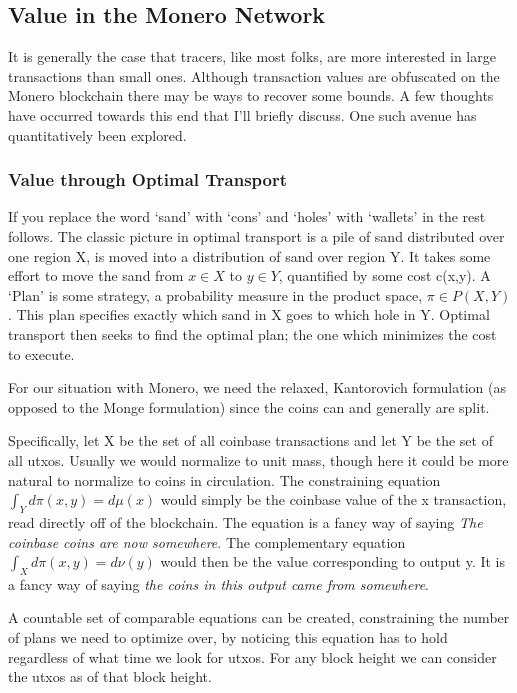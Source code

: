 \subsection{Value in the Monero Network}

It is generally the case that tracers, like most folks, are more interested in large transactions than small ones.  
Although transaction values are obfuscated on the Monero blockchain there may be ways to recover some bounds.
A few thoughts have occurred towards this end that I'll briefly discuss.  One such avenue has quantitatively been explored.

\subsubsection{Value through Optimal Transport}
If you replace the word `sand' with `cons' and `holes' with `wallets' in \cite{villani2009optimal} the rest follows.  
The classic picture in optimal transport is a pile of sand distributed over one region X, is moved into a distribution of sand over region Y.  
It takes some effort to move the sand from $x \in X$ to $y \in Y$, quantified by some cost c(x,y).  
A `Plan' is some strategy, a probability measure in the product space, $\pi \in P(X,Y)$.  This plan specifies exactly which sand in X goes to which hole in Y.
Optimal transport then seeks to find the optimal plan; the one which minimizes the cost to execute.

For our situation with Monero, we need the relaxed, Kantorovich formulation (as opposed to the Monge formulation) since the coins can and generally are split.

Specifically, let X be the set of all coinbase transactions and let Y be the set of all utxos.  
Usually we would normalize to unit mass, though here it could be more natural to normalize to coins in circulation.
The constraining equation $\int_Y d\pi(x,y) = d\mu(x)$ would simply be the coinbase value of the x transaction, read directly off of the blockchain.
The equation is a fancy way of saying \textit{The coinbase coins are now somewhere}.
The complementary equation  $\int_X d\pi(x,y) = d\nu(y)$ would then be the value corresponding to output y.  
It is a fancy way of saying \textit{the coins in this output came from somewhere}.

A countable set of comparable equations can be created, constraining the number of plans we need to optimize over, by noticing this equation has to hold regardless of what time we look for utxos. 
For any block height we can consider the utxos as of that block height.

